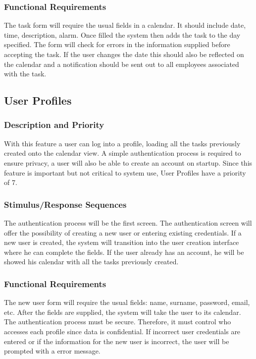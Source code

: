 \documentclass{article}
\begin{document}
\subsubsection{Functional Requirements}
The task form will require the usual fields in a calendar. 
It should include date, time, description, alarm. 
Once filled the system then adds the task to the day specified. 
The form will check for errors in the information supplied before accepting the task. 
If the user changes the date this should also be reflected on the calendar and a notification should be sent out to all employees associated with the task.

\subsection{User Profiles}
\subsubsection{Description and Priority}
With this feature a user can log into a profile, loading all the tasks previously created onto the calendar view. 
A simple authentication process is required to ensure privacy, a user will also be able to create an account on startup. 
Since this feature is important but not critical to system use, User Profiles have a priority of 7.

\subsubsection{Stimulus/Response Sequences}
The authentication process will be the first screen. 
The authentication screen will offer the possibility of creating a new user or entering existing credentials. 
If a new user is created, the system will transition into the user creation interface where he can complete the fields. 
If the user already has an account, he will be showed his calendar with all the tasks previously created. 
\subsubsection{Functional Requirements}
The new user form will require the usual fields: name, surname, password, email, etc. 
After the fields are supplied, the system will take the user to its calendar. 
The authentication process must be secure. Therefore, it must control who accesses each profile since data is confidential. 
If incorrect user credentials are entered or if the information for the new user is incorrect, the user will be prompted with a error message.
\end{document}
